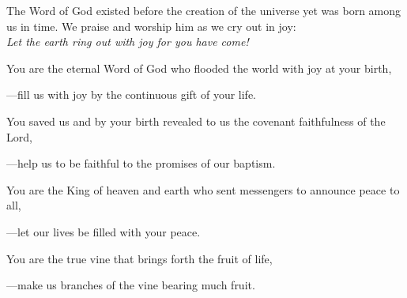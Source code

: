 \intercessions\indent

\begin{hangpar}

The Word of God existed before the creation of the universe yet was born among us in time. We praise and worship him as we cry out in joy:\\
\emph{Let the earth ring out with joy for you have come!}

\medskip You are the eternal Word of God who flooded the world with joy at your birth,

{\color{red}---\thinspace}fill us with joy by the continuous gift of your life.

\medskip You saved us and by your birth revealed to us the covenant faithfulness of the Lord,

{\color{red}---\thinspace}help us to be faithful to the promises of our baptism.

\medskip You are the King of heaven and earth who sent messengers to announce peace to all,

{\color{red}---\thinspace}let our lives be filled with your peace.

\medskip You are the true vine that brings forth the fruit of life,

{\color{red}---\thinspace}make us branches of the vine bearing much fruit.

\medskip

\end{hangpar}